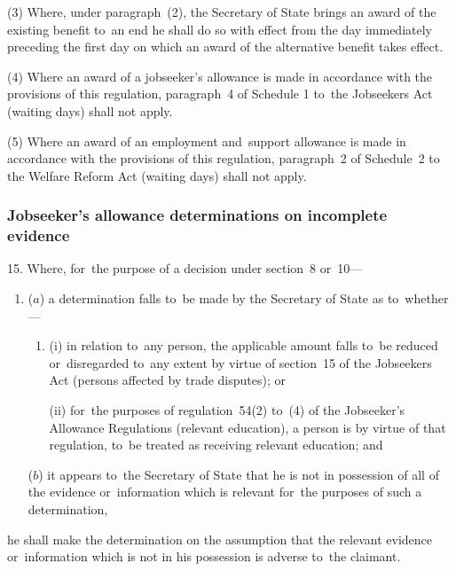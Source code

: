 \documentclass[12pt,a4paper]{article}
\begin{document}
(3) Where, under paragraph~(2), the Secretary of State brings an award of the existing benefit to~an end he shall do so with effect from the day immediately preceding the first day on which an award of the alternative benefit takes effect.

(4) Where an award of a jobseeker’s allowance is made in accordance with the provisions of this regulation, paragraph~4 of Schedule 1 to~the Jobseekers Act (waiting days) shall not apply.

\enlargethispage{\baselineskip}

(5) Where an award of an employment and~support allowance is made in accordance with the provisions of this regulation, paragraph~2 of Schedule~2 to the Welfare Reform Act (waiting days) shall not apply.


\subsubsection[15. Jobseeker’s allowance determinations on incomplete evidence]{Jobseeker’s allowance determinations on incomplete evidence}

15.  Where, for~the purpose of a decision under section~8 or~10—
\begin{enumerate}\item[]
($a$) a determination falls to~be made by the Secretary of State as to~whether—
\begin{enumerate}\item[]
(i) in relation to~any person, the applicable amount falls to~be reduced or~disregarded to~any extent by virtue of section~15 of the Jobseekers Act (persons affected by trade disputes); or

(ii) for~the purposes of regulation~54(2) to~(4) of the Jobseeker’s Allowance Regulations (relevant education), a person is by virtue of that regulation, to~be treated as receiving relevant education; and
\end{enumerate}

($b$) it appears to~the Secretary of State that he is not in possession of all of the evidence or~information which is relevant for~the purposes of such a determination,
\end{enumerate}
he shall make the determination on the assumption that the relevant evidence or~information which is not in his possession is adverse to~the claimant.
\end{document}
